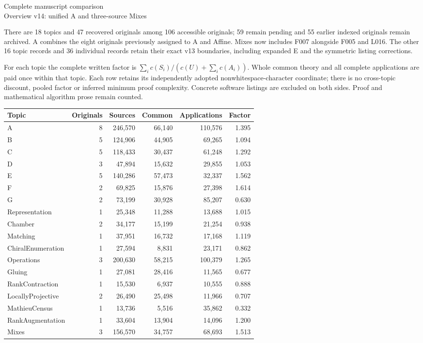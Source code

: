 \documentclass[11pt,a4paper]{article}
\begin{document}
\begin{center}{\Large Complete manuscript comparison}\\[3pt]
Overview v14: unified A and three-source Mixes\end{center}
There are 18 topics and 47 recovered originals among 106 accessible originals; 59 remain pending and 55 earlier indexed originals remain archived. A combines the eight originals previously assigned to A and Affine. Mixes now includes F007 alongside F005 and L016. The other 16 topic records and 36 individual records retain their exact v13 boundaries, including expanded E and the symmetric listing corrections.

For each topic the complete written factor is $\sum_i c(S_i)/(c(U)+\sum_i c(A_i))$. Whole common theory and all complete applications are paid once within that topic. Each row retains its independently adopted nonwhitespace-character coordinate; there is no cross-topic discount, pooled factor or inferred minimum proof complexity. Concrete software listings are excluded on both sides. Proof and mathematical algorithm prose remain counted.
\begin{center}\small\begin{tabular}{lrrrrr}\toprule
Topic & Originals & Sources & Common & Applications & Factor\\\midrule
A & 8 & 246,570 & 66,140 & 110,576 & 1.395 \\
B & 5 & 124,906 & 44,905 & 69,265 & 1.094 \\
C & 5 & 118,433 & 30,437 & 61,248 & 1.292 \\
D & 3 & 47,894 & 15,632 & 29,855 & 1.053 \\
E & 5 & 140,286 & 57,473 & 32,337 & 1.562 \\
F & 2 & 69,825 & 15,876 & 27,398 & 1.614 \\
G & 2 & 73,199 & 30,928 & 85,207 & 0.630 \\
Representation & 1 & 25,348 & 11,288 & 13,688 & 1.015 \\
Chamber & 2 & 34,177 & 15,199 & 21,254 & 0.938 \\
Matching & 1 & 37,951 & 16,732 & 17,168 & 1.119 \\
ChiralEnumeration & 1 & 27,594 & 8,831 & 23,171 & 0.862 \\
Operations & 3 & 200,630 & 58,215 & 100,379 & 1.265 \\
Gluing & 1 & 27,081 & 28,416 & 11,565 & 0.677 \\
RankContraction & 1 & 15,530 & 6,937 & 10,555 & 0.888 \\
LocallyProjective & 2 & 26,490 & 25,498 & 11,966 & 0.707 \\
MathieuCensus & 1 & 13,736 & 5,516 & 35,862 & 0.332 \\
RankAugmentation & 1 & 33,604 & 13,904 & 14,096 & 1.200 \\
Mixes & 3 & 156,570 & 34,757 & 68,693 & 1.513 \\
\bottomrule\end{tabular}\end{center}
\end{document}
